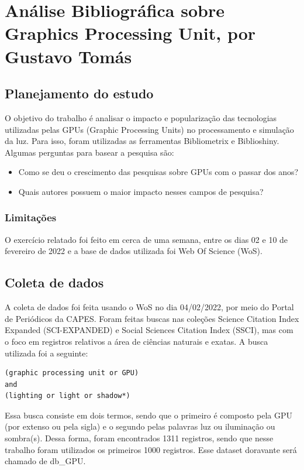 
\chapter{Análise Bibliográfica sobre Graphics Processing Unit, por Gustavo Tomás}

\section{Planejamento do estudo}

O objetivo do trabalho é analisar o impacto e popularização das tecnologias utilizadas pelas GPUs (Graphic Processing Units) no processamento e simulação da luz. Para isso, foram utilizadas as ferramentas Bibliometrix e Biblioshiny. Algumas perguntas para basear a pesquisa são:

\begin{itemize}
    \item Como se deu o crescimento das pesquisas sobre GPUs com o passar dos anos?
    \item Quais autores possuem o maior impacto nesses campos de pesquisa?
\end{itemize}

\subsection{Limitações} O exercício relatado foi feito em cerca de uma semana, entre os dias 02 e 10 de fevereiro de 2022 e a base de dados utilizada foi Web Of Science (WoS).

\section{Coleta de dados}

A coleta de dados foi feita usando o WoS no dia 04/02/2022, por meio do Portal de Periódicos da CAPES. Foram feitas buscas nas coleções Science Citation Index Expanded (SCI-EXPANDED) e Social Sciences Citation Index (SSCI), mas com o foco em registros relativos a área de ciências naturais e exatas. A busca utilizada foi a seguinte:

\begin{verbatim}
(graphic processing unit or GPU) 
and
(lighting or light or shadow*)
\end{verbatim}

Essa busca consiste em dois termos, sendo que o primeiro é composto pela GPU (por extenso ou pela sigla) e o segundo pelas palavras luz ou iluminação ou sombra(s). Dessa forma, foram encontrados 1311 registros, sendo que nesse trabalho foram utilizados os primeiros 1000 registros. Esse dataset doravante será chamado de db\_GPU.

